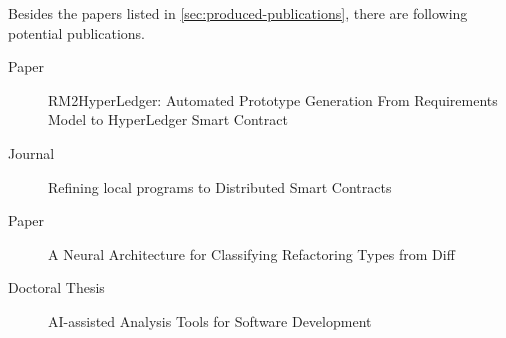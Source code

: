 Besides the papers listed in \autoref{sec:produced-publications}, there are following potential publications.

\begin{description}
\item[Paper] RM2HyperLedger: Automated Prototype Generation From Requirements Model to HyperLedger Smart Contract
\item[Journal] Refining local programs to Distributed Smart Contracts
\item[Paper] A Neural Architecture for Classifying Refactoring Types from Diff
\item[Doctoral Thesis] AI-assisted Analysis Tools for Software Development
\end{description}



